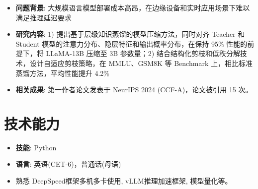 \documentclass{cls/resume}
\begin{document}
\begin{itemize}
  \item \textbf{问题背景}: 大规模语言模型部署成本高昂，在边缘设备和实时应用场景下难以满足推理延迟要求
  \item \textbf{研究内容}: 1) 提出基于层级知识蒸馏的模型压缩方法，同时对齐 Teacher 和 Student 模型的注意力分布、隐层特征和输出概率分布，在保持 95\% 性能的前提下，将 LLaMA-13B 压缩至 3B 参数量；2) 结合结构化剪枝和低秩分解技术，设计自适应剪枝策略，在 MMLU、GSM8K 等 Benchmark 上，相比标准蒸馏方法，平均性能提升 4.2\%
  \item \textbf{相关成果}: 第一作者论文发表于 NeurIPS 2024 (CCF-A)，论文被引用 15 次。
\end{itemize}

\section{技术能力}
\begin{itemize}[parsep=0.2ex]
    \item \textbf{技能}: Python
    \item \textbf{语言}: 英语(CET-6)，普通话(母语)
    \item 熟悉 DeepSpeed框架多机多卡使用, vLLM推理加速框架, 模型量化等。
\end{itemize}
\end{document}
